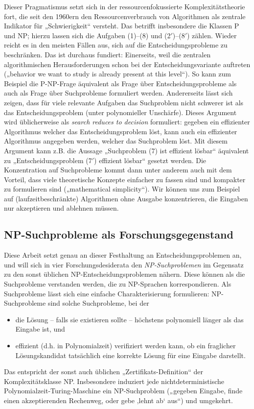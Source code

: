 Dieser Pragmatismus setzt sich in der ressourcenfokussierte Komplexitätstheorie fort, die seit den 1960ern den Ressourcenverbrauch von Algorithmen als zentrale Indikator für „Schwierigkeit“ versteht. Das betrifft insbesondere die Klassen P und NP; hierzu lassen sich die Aufgaben (1)--(8) und (2$'$)--(8$'$) zählen.
Wieder reicht es in den meisten Fällen aus, sich auf die Entscheidungsprobleme zu beschränken.
Das ist durchaus fundiert:
Einerseits, weil die zentralen algorithmischen Herausforderungen schon bei der Entscheidungsvariante auftreten („behavior we want to study is already present at this level“). So kann zum Beispiel die P-NP-Frage äquivalent als Frage über Entscheidungsprobleme als auch als Frage über Suchprobleme formuliert werden. Andererseits lässt sich zeigen, dass für viele relevante Aufgaben das Suchproblem nicht schwerer ist als das Entscheidungsproblem (unter polynomieller Unschärfe). Dieses Argument wird üblicherweise als \emph{search reduces to decision} formuliert: gegeben ein effizienter Algorithmus welcher das Entscheidungsproblem löst, kann auch ein effizienter Algorithmus angegeben werden, welcher das Suchproblem löst. Mit diesem Argument kann z.B. die Aussage „Suchproblem (7) ist effizient lösbar“ äquivalent zu „Entscheidungsproblem (7$'$) effizient lösbar“ gesetzt werden. Die Konzentration auf Suchprobleme kommt dann unter anderem auch mit dem Vorteil, dass viele theoretische Konzepte einfacher zu fassen sind und kompakter zu formulieren sind („mathematical simplicity“). Wir können uns zum Beispiel auf (laufzeitbeschränkte) Algorithmen ohne Ausgabe konzentrieren, die Eingaben nur akzeptieren und ablehnen müssen. 

\subsection*{NP-Suchprobleme als Forschungsgegenstand}

Diese Arbeit setzt genau an dieser Festhaltung an Entscheidungsproblemen an, und will sich in vier Forschungsdesiderata den \emph{NP-Suchproblemen} im Gegensatz zu den sonst üblichen NP-Entscheidungsproblemen nähern.
Diese können als die Suchprobleme verstanden werden, die zu NP-Sprachen korrespondieren. Als Suchprobleme lässt sich eine einfache Charakterisierung formulieren: NP-Suchprobleme sind solche Suchprobleme, bei der 
\begin{itemize}[noitemsep]
    \item die Lösung -- falls sie existieren sollte -- höchstens polynomiell länger als das Eingabe ist, und 
    \item effizient (d.h. in Polynomialzeit) verifiziert werden kann, ob ein fraglicher Lösungskandidat tatsächlich eine korrekte Lösung für eine Eingabe darstellt.
\end{itemize}
Das entspricht der sonst auch üblichen „Zertifikats-Definition“ der Komplexitätsklasse NP. Insbesondere induziert jede nichtdeterministische Polynomialzeit-Turing-Maschine ein NP-Suchproblem („gegeben Eingabe, finde einen akzeptierenden Rechenweg, oder gebe ‚lehnt ab‘ aus“) und umgekehrt.

